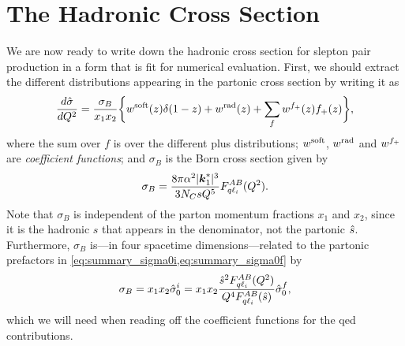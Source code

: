 \section{The Hadronic Cross Section}
We are now ready to write down the hadronic cross section for slepton pair production in a form that is fit for numerical evaluation.
First, we should extract the different distributions appearing in the partonic cross section by writing it as
\begin{equation}\label{eq:parton_xsec_ws}
    \frac{d\hat\sigma}{dQ^2} = \frac{\sigma_B}{x_1 x_2} \biggl\{
        w^{\text{soft}}(z)\delta(1-z) + w^{\text{rad}}(z) + \sum_{f} w^{f_+}(z) f_+(z)
    \biggr\},
\end{equation}
where the sum over $f$ is over the different plus distributions; $w^{\text{soft}}$, $w^{\text{rad}}$ and $w^{f_+}$ are \emph{coefficient functions}; and $\sigma_B$ is the Born cross section given by
\begin{equation}
    \sigma_B = \frac{8\pi\alpha^2 \lvert\boldsymbol{k}_1^*\rvert^3}{3N_C s Q^5} F_{q\ell_i}^{AB}(Q^2).
\end{equation}
Note that $\sigma_B$ is independent of the parton momentum fractions $x_1$ and $x_2$, since it is the hadronic $s$ that appears in the denominator, not the partonic $\hat{s}$.
Furthermore, $\sigma_B$ is---in four spacetime dimensions---related to the partonic prefactors in \cref{eq:summary_sigma0i,eq:summary_sigma0f} by
\begin{align}
    \sigma_B = x_1x_2\hat\sigma_0^i = x_1x_2 \frac{\hat{s}^2 F_{q\ell_i}^{AB}(Q^2)}{Q^4 F_{q\ell_i}^{AB}(\hat{s})} \hat\sigma_0^f,
\end{align}
which we will need when reading off the coefficient functions for the \gls{qed} contributions.

